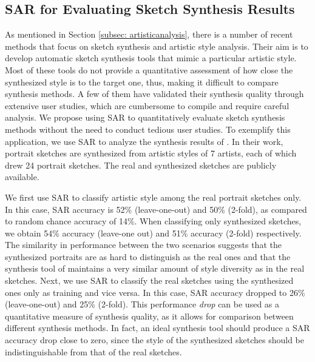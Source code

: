 \subsection{SAR for Evaluating Sketch Synthesis Results}
\vspace{-2mm}
As mentioned in Section \ref{subsec: artisticanalysis}, there is a number of recent methods that focus on sketch synthesis and artistic style analysis. Their aim is to develop automatic sketch synthesis tools that mimic a particular artistic style. Most of these tools do not provide a quantitative assessment of how close the synthesized style is to the target one, thus, making it difficult to compare synthesis methods. A few of them have validated their synthesis quality through extensive user studies, which are cumbersome to compile and require careful analysis. We propose using SAR to quantitatively evaluate sketch synthesis methods without the need to conduct tedious user studies. To exemplify this application, we use SAR to analyze the synthesis results of . In their work, portrait sketches are synthesized from artistic styles of 7 artists, each of which drew 24 portrait sketches. The real and synthesized sketches are publicly available.

We first use SAR to classify artistic style among the real portrait sketches only. In this case, SAR accuracy is 52\% (leave-one-out) and 50\% (2-fold), as compared to random chance accuracy of 14\%. When classifying only synthesized sketches, we obtain 54\% accuracy (leave-one out) and 51\% accuracy (2-fold) respectively. The  similarity in performance between the two scenarios suggests that the synthesized portraits are as hard to distinguish as the real ones and that the synthesis tool of \cite{Berger:2013:SAP:2461912.2461964} maintains a very similar amount of style diversity as in the real sketches. Next, we use SAR to classify the real sketches using the synthesized ones only as training and vice versa. In this case, SAR accuracy dropped to 26\% (leave-one-out) and 25\% (2-fold). This performance \emph{drop} can be used as a quantitative measure of synthesis quality, as it allows for comparison between different synthesis methods. In fact, an ideal synthesis tool should produce a SAR accuracy drop close to zero, since the style of the synthesized sketches should be indistinguishable from that of the real sketches.

